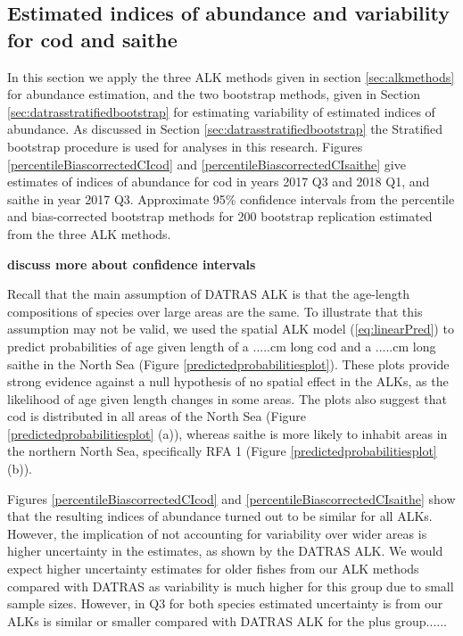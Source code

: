 \documentclass[a4paper 12pt]{article}
\numberwithin{equation}{section}
\begin{document}
\subsection{Estimated indices of abundance and variability for cod and saithe}
\label{sec:codresults}

In this section we apply the three ALK methods given in section \ref{sec:alkmethods} for abundance estimation, and the two bootstrap methods, given in Section \ref{sec:datrasstratifiedbootstrap} for estimating variability of estimated indices of abundance. As discussed in Section \ref{sec:datrasstratifiedbootstrap} the Stratified bootstrap procedure is used for analyses in this research. Figures \ref{percentileBiascorrectedCIcod} and  \ref{percentileBiascorrectedCIsaithe} give estimates of indices of abundance for cod in years 2017 Q3 and 2018 Q1, and  saithe in year 2017 Q3. Approximate 95\% confidence intervals from the percentile and bias-corrected bootstrap methods for 200 bootstrap replication estimated from the three ALK methods.

{\bf discuss more about confidence intervals}

Recall that the main assumption of DATRAS ALK is that the age-length compositions of species over large areas are the same. To illustrate that this assumption may not be valid, we used  the spatial ALK model (\ref{eq:linearPred}) to predict probabilities of age given length of a .....cm long cod and a .....cm long saithe in the North Sea (Figure \ref{predictedprobabilitiesplot}). These plots provide strong evidence against a null hypothesis of no spatial effect in the ALKs, as the likelihood of age given length changes in some areas. The plots also suggest that cod is distributed in all areas of the North Sea (Figure \ref{predictedprobabilitiesplot} (a)), whereas saithe is more likely to inhabit areas in the northern North Sea, specifically RFA 1 (Figure \ref{predictedprobabilitiesplot} (b)). 

Figures \ref{percentileBiascorrectedCIcod} and  \ref{percentileBiascorrectedCIsaithe} show that the resulting indices of abundance turned out to be similar for all ALKs. However, the implication of not accounting for variability over wider areas is higher  uncertainty in the estimates, as shown by the DATRAS ALK. We would expect higher uncertainty estimates for older fishes from our ALK methods compared with DATRAS as variability is much higher for this group due to small sample sizes. However, in Q3 for both species estimated uncertainty is from our ALKs is similar or smaller compared with DATRAS ALK for the plus group......\\
\end{document}
